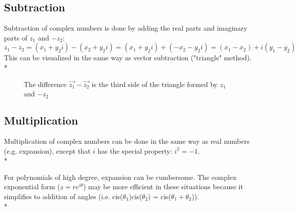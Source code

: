 \documentclass[]{article}
\begin{document}
    \subsection{Subtraction}
        \noindent Subtraction of complex numbers is done by adding the real parts and imaginary parts of $z_1$ and $-z_2$: $z_1 - z_2 = (x_1+y_2i)-(x_2+y_2i) = (x_1+y_2i)+(-x_2-y_2i)=(x_1-x_2)+i(y_1-y_2)$ This can be visualized in the same way as vector subtraction ("triangle" method). \\*  
        \begin{figure}[!h]
    	    \centering
    	    \caption{The difference $\vec{z_1}-\vec{z_2}$ is the third side of the triangle formed by $z_1$ and $-z_2$}
    \end{figure}
    \subsection{Multiplication}
         \noindent Multiplication of complex numbers can be done in the same way as real numbers (e.g. expansion), except that $i$ has the special property: $i^2=-1$. \\*  
         
         \noindent For polynomials of high degree, expansion can be cumbersome. The complex exponential form ($z=re^{i\theta}$) may be more efficient in these situations because it simplifies to addition of angles (i.e. cis($\theta_1$)cis($\theta_2$) = cis($\theta_1+\theta_2$)).  \\*  
         
\end{document}
